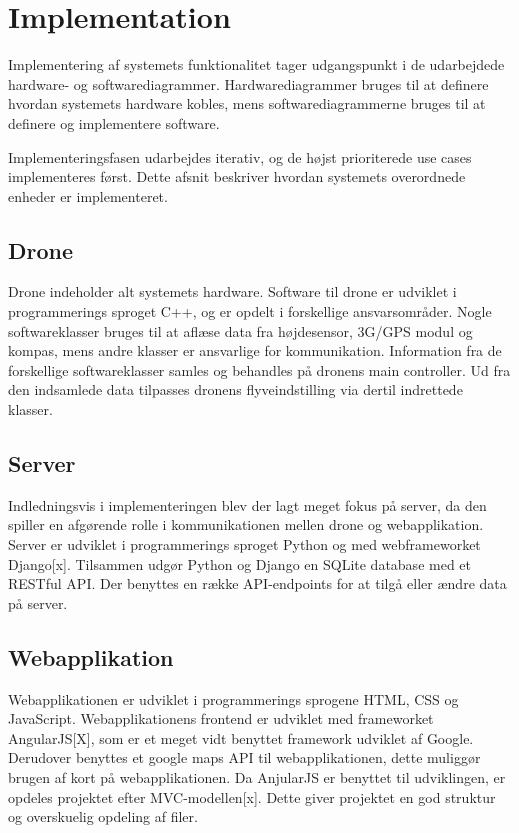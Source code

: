 \chapter{Implementation}
Implementering af systemets funktionalitet tager udgangspunkt i de udarbejdede hardware- og softwarediagrammer. Hardwarediagrammer bruges til at definere hvordan systemets hardware kobles, mens softwarediagrammerne bruges til at definere og implementere software.

Implementeringsfasen udarbejdes iterativ, og de højst prioriterede use cases implementeres først. 
Dette afsnit beskriver hvordan systemets overordnede enheder er implementeret.


\section{Drone}
Drone indeholder alt systemets hardware. Software til drone er udviklet i programmerings sproget C++, og er opdelt i forskellige ansvarsområder. Nogle softwareklasser bruges til at aflæse data fra højdesensor, 3G/GPS modul og kompas, mens andre klasser er ansvarlige for kommunikation. Information fra de forskellige softwareklasser samles og behandles på dronens main controller. Ud fra den indsamlede data tilpasses dronens flyveindstilling via dertil indrettede klasser. 


\section{Server}
Indledningsvis i implementeringen blev der lagt meget fokus på server, da den spiller en afgørende rolle i kommunikationen mellen drone og webapplikation. 
Server er udviklet i programmerings sproget Python og med webframeworket Django[x].
Tilsammen udgør Python og Django en SQLite database med et RESTful API. Der benyttes en række API-endpoints for at tilgå eller ændre data på server.

\section{Webapplikation}
Webapplikationen  er udviklet i programmerings sprogene HTML, CSS og JavaScript. Webapplikationens frontend er udviklet med frameworket AngularJS[X], som er et meget vidt benyttet framework udviklet af Google. Derudover benyttes et google maps API til webapplikationen, dette muliggør brugen af kort på webapplikationen. Da AnjularJS er benyttet til udviklingen, er opdeles projektet efter MVC-modellen[x]. Dette giver projektet en god struktur og overskuelig opdeling af filer.